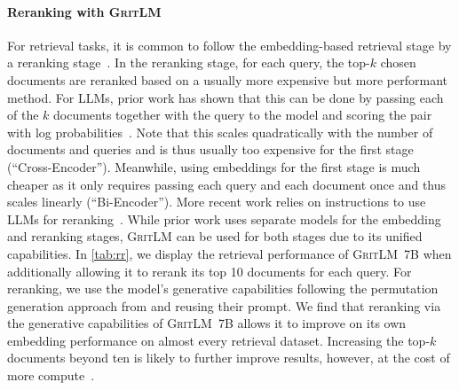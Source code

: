 \documentclass{article}
\newcommand{\model}{\textsc{GritLM}}
\newcommand{\modelbase}{\textsc{GritLM~7B}}
\begin{document}
\paragraph{Reranking with \model{}} For retrieval tasks, it is common to follow the embedding-based retrieval stage by a reranking stage~\cite{nogueira2020passage}. In the reranking stage, for each query, the top-$k$ chosen documents are reranked based on a usually more expensive but more performant method. For LLMs, prior work has shown that this can be done by passing each of the $k$ documents together with the query to the model and scoring the pair with log probabilities~\cite{muennighoff2022sgpt}. Note that this scales quadratically with the number of documents and queries and is thus usually too expensive for the first stage (``Cross-Encoder''). Meanwhile, using embeddings for the first stage is much cheaper as it only requires passing each query and each document once and thus scales linearly (``Bi-Encoder''). More recent work relies on instructions to use LLMs for reranking~\cite{sun2023chatgpt,ma2023zeroshot,pradeep2023rankvicuna,pradeep2023rankzephyr}. While prior work uses separate models for the embedding and reranking stages, \model{} can be used for both stages due to its unified capabilities. In \autoref{tab:rr}, we display the retrieval performance of \modelbase{} when additionally allowing it to rerank its top 10 documents for each query. For reranking, we use the model's generative capabilities following the permutation generation approach from \citet{sun2023chatgpt} and reusing their prompt. We find that reranking via the generative capabilities of \modelbase{} allows it to improve on its own embedding performance on almost every retrieval dataset. Increasing the top-$k$ documents beyond ten is likely to further improve results, however, at the cost of more compute~\cite{muennighoff2022sgpt}.
\end{document}
